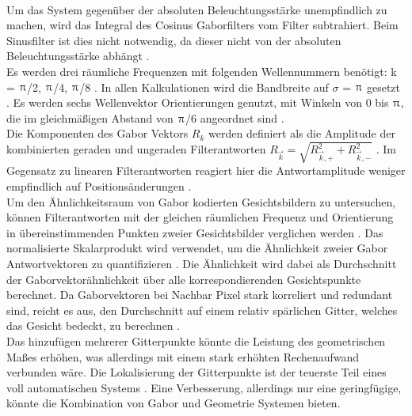 \documentclass[12pt,a4paper,headinclude,twoside, plainheadsepline, open=right,numbers=noenddot]{scrreprt}
\begin{document}
\paragraph{}
Um das System gegenüber der absoluten Beleuchtungsstärke unempfindlich zu machen, wird das Integral des Cosinus Gaborfilters vom Filter subtrahiert. Beim Sinusfilter ist dies nicht notwendig, da dieser nicht von der absoluten Beleuchtungsstärke abhängt \cite{Lyons1998CodingFacialExpressionsWithGaborWavelets}. \\
Es werden drei räumliche Frequenzen mit folgenden Wellennummern benötigt: k = {$\piup$/2, $\piup$/4, $\piup$/8} \cite{Lyons1998CodingFacialExpressionsWithGaborWavelets}. In allen Kalkulationen wird die Bandbreite auf $\sigma$ = $\piup$ gesetzt \cite{Lyons1998CodingFacialExpressionsWithGaborWavelets}. Es werden sechs Wellenvektor Orientierungen genutzt, mit Winkeln von 0 bis $\piup$, die im gleichmäßigen Abstand von $\piup$/6 angeordnet sind \cite{Lyons1998CodingFacialExpressionsWithGaborWavelets}.
\\
Die Komponenten des Gabor Vektors $R_k$ werden definiert als die Amplitude der kombinierten geraden und ungeraden Filterantworten $R_{\vec{k}}=\sqrt{R^{2}_{\vec{k},+}+R^{2}_{\vec{k},-}}$ \cite{Lyons1998CodingFacialExpressionsWithGaborWavelets}. Im Gegensatz zu linearen Filterantworten reagiert hier die Antwortamplitude weniger empfindlich auf Positionsänderungen \cite{Lyons1998CodingFacialExpressionsWithGaborWavelets}.
\\
Um den Ähnlichkeitsraum von Gabor kodierten Gesichtsbildern zu untersuchen, können Filterantworten mit der gleichen räumlichen Frequenz und Orientierung in übereinstimmenden Punkten zweier Gesichtsbilder verglichen werden \cite{Lyons1998CodingFacialExpressionsWithGaborWavelets}. Das normalisierte Skalarprodukt wird verwendet, um die Ähnlichkeit zweier Gabor Antwortvektoren zu quantifizieren \cite{Lyons1998CodingFacialExpressionsWithGaborWavelets}. Die Ähnlichkeit wird dabei als Durchschnitt der Gaborvektorähnlichkeit über alle korrespondierenden Gesichtspunkte berechnet. Da Gaborvektoren bei Nachbar Pixel stark korreliert und redundant sind, reicht es aus, den Durchschnitt auf einem relativ spärlichen Gitter, welches das Gesicht bedeckt,  zu berechnen \cite{Lyons1998CodingFacialExpressionsWithGaborWavelets}.
\\
Das hinzufügen mehrerer Gitterpunkte könnte die Leistung des geometrischen Maßes erhöhen, was allerdings mit einem stark erhöhten Rechenaufwand verbunden wäre. Die Lokalisierung der Gitterpunkte ist der teuerste Teil eines voll automatischen Systems \cite{Lyons1998CodingFacialExpressionsWithGaborWavelets}. Eine Verbesserung, allerdings nur eine geringfügige, könnte die Kombination von Gabor und Geometrie Systemen bieten\cite{Lyons1998CodingFacialExpressionsWithGaborWavelets}.
\end{document}
